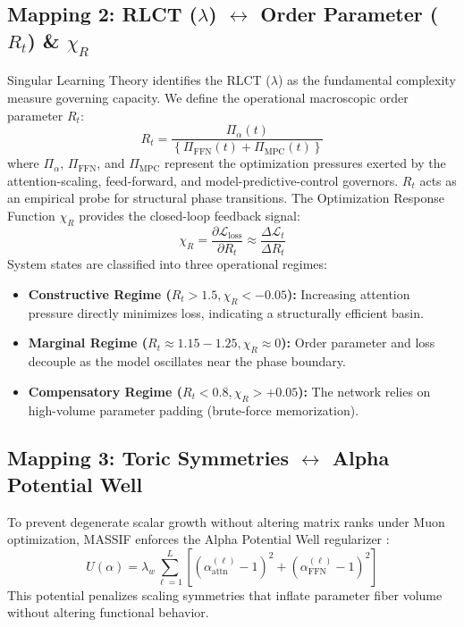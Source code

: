 \documentclass[11pt]{article}
\begin{document}
\subsection{Mapping 2: RLCT (\texorpdfstring{$\lambda$}{lambda}) \texorpdfstring{$\leftrightarrow$}{<=>} Order Parameter (\texorpdfstring{$R_t$}{Rt}) \& \texorpdfstring{$\chi_R$}{chi\_R}}
Singular Learning Theory identifies the RLCT ($\lambda$) \cite{watanabe2009algebraic} as the fundamental complexity measure governing capacity. We define the operational macroscopic order parameter $R_t$:
\begin{equation}
R_t = \frac{\Pi_\alpha(t)}{\left\{\Pi_{\text{FFN}}(t) + \Pi_{\text{MPC}}(t)\right\}}
\end{equation}
where $\Pi_\alpha$, $\Pi_{\text{FFN}}$, and $\Pi_{\text{MPC}}$ represent the optimization pressures exerted by the attention-scaling, feed-forward, and model-predictive-control governors. $R_t$ acts as an empirical probe for structural phase transitions. The Optimization Response Function $\chi_R$ provides the closed-loop feedback signal:
\begin{equation}
\chi_R = \frac{\partial \mathcal{L}_{\text{loss}}}{\partial R_t} \approx \frac{\Delta \mathcal{L}_t}{\Delta R_t}
\end{equation}
System states are classified into three operational regimes:
\begin{itemize}
    \item \textbf{Constructive Regime ($R_t > 1.5, \chi_R < -0.05$):} Increasing attention pressure directly minimizes loss, indicating a structurally efficient basin.
    \item \textbf{Marginal Regime ($R_t \approx 1.15 - 1.25, \chi_R \approx 0$):} Order parameter and loss decouple as the model oscillates near the phase boundary.
    \item \textbf{Compensatory Regime ($R_t < 0.8, \chi_R > +0.05$):} The network relies on high-volume parameter padding (brute-force memorization).
\end{itemize}

\subsection{Mapping 3: Toric Symmetries \texorpdfstring{$\leftrightarrow$}{<=>} Alpha Potential Well}
To prevent degenerate scalar growth without altering matrix ranks under Muon optimization, MASSIF enforces the Alpha Potential Well regularizer \cite{massif}:
\begin{equation}
U(\alpha) = \lambda_w \sum_{\ell=1}^L \left[ (\alpha_{\text{attn}}^{(\ell)} - 1)^2 + (\alpha_{\text{FFN}}^{(\ell)} - 1)^2 \right]
\end{equation}
This potential penalizes scaling symmetries that inflate parameter fiber volume without altering functional behavior.
\end{document}
